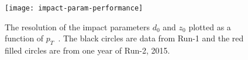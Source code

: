 \begin{figure}[ht]
  \centering
  \texttt{[image: impact-param-performance]}
  \caption[ATLAS impact parameter resolution (2012 v.s. 2015).]{The resolution
    of the impact parameters $d_0$ and $z_0$ plotted as a function of
    $p_T$~\cite{ATLAS_RUN_2_PERF}. The black circles are data from Run-1 and the
    red filled circles are from one year of Run-2, 2015.}
  \label{fig:impact-param-reso}
\end{figure}
